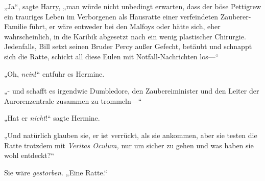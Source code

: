 „Ja“, sagte Harry, „man würde nicht unbedingt erwarten, dass der böse Pettigrew ein trauriges Leben im Verborgenen als Hausratte einer verfeindeten Zauberer-Familie führt, er wäre entweder bei den Malfoys oder hätte sich, eher wahrscheinlich, in die Karibik abgesetzt nach ein wenig plastischer Chirurgie. Jedenfalls, Bill setzt seinen Bruder Percy außer Gefecht, betäubt und schnappt sich die Ratte, schickt all diese Eulen mit Notfall-Nachrichten los—“

„Oh, \emph{nein}!“ entfuhr es Hermine.

„- und schafft es irgendwie Dumbledore, den Zaubereiminister und den Leiter der Aurorenzentrale zusammen zu trommeln—“

„Hat er \emph{nicht}!“ sagte Hermine.

„Und natürlich glauben sie, er ist verrückt, als sie ankommen, aber sie testen die Ratte trotzdem mit \emph{Veritas Oculum,} nur um sicher zu gehen und was haben sie wohl entdeckt?“%

Sie wäre \emph{gestorben}. „Eine Ratte.“

